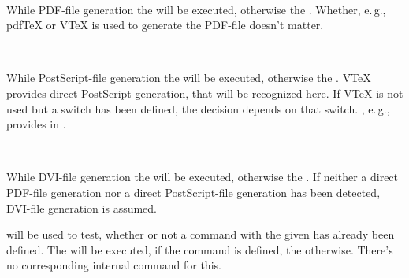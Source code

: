 \begin{Declaration}
  \\
\end{Declaration}
%
%
While PDF-file generation the  will be executed,
otherwise the . Whether, e.\,g., pdf\TeX{} or V\TeX{}
is used to generate the PDF-file doesn't matter.
%
%
%


\begin{Declaration}
  \\
\end{Declaration}
%
%
While PostScript-file generation the  will be executed,
otherwise the . V\TeX{} provides direct PostScript
generation, that will be recognized here. If V\TeX{} is not used but a switch
 has been defined, the decision depends on that
switch. \KOMAScript{}, e.\,g., provides  in
.
%
%
%


\begin{Declaration}
  \\
\end{Declaration}
%
%
While DVI-file generation the  will be executed,
otherwise the . If neither a direct PDF-file
generation nor a direct PostScript-file generation has been detected, DVI-file
generation is assumed.
%
%
%


\begin{Declaration}
\end{Declaration}
%
\eTeX{} will be used to test, whether or not a command with the given
 has already been defined. The  will be
executed, if the command is defined, the 
otherwise. There's no corresponding internal command for this.
%
%


